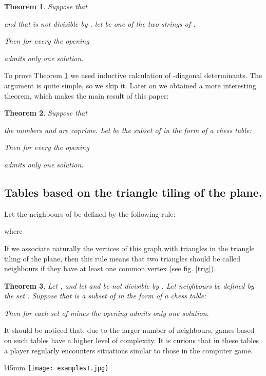\documentclass[english,12pt]{article}
\newtheorem{theorem}{Theorem}
\theoremstyle{remark}
\theoremstyle{definition}
\theoremstyle{definition}
\begin{document}
\begin{theorem} \label{t:2_times_n}
Suppose that

and that  is not divisible by . let  be one of the two strings of :

Then for every  the opening

admits only one solution.
\end{theorem}

To prove Theorem \ref{t:2_times_n} we used inductive calculation of -diagonal determinants. The
argument is quite simple, so we skip it. Later on we obtained a more interesting theorem, which
makes the main result of this paper:

\begin{theorem} \label{t:chess}
Suppose that

the numbers  and  are coprime. Let  be the subset of
 in the form of a chess table:

Then for every  the opening

admits only one solution.
\end{theorem}


\subsection{Tables based on the triangle tiling of the plane.}


Let the neighbours of  be defined by the following rule:

where


If we associate naturally the vertices of this graph with
triangles in the triangle tiling of the plane, then this rule
means that two triangles should be called neighbours if they have
at least one common vertex (see fig. \ref{trig}).

\begin{theorem}\label{tr}
  Let  , and let  and  be not
  divisible by . Let neighbours be defined by the set . Suppose that  is a subset of 
  in the form of a chess table:
  
  Then for each set of mines  the opening  admits only one
  solution.
\end{theorem}

It should be noticed that, due to the larger number of neighbours, games based on such tables have
a higher level of complexity. It is curious that in these tables a player regularly encounters
situations similar to those in the computer game.

\begin{wrapfigure}{l}{45mm}
\texttt{[image: examplesT.jpg]}\label{trig}
 \caption{
Table on base of equilateral triangles.}
\end{wrapfigure}
\end{document}
